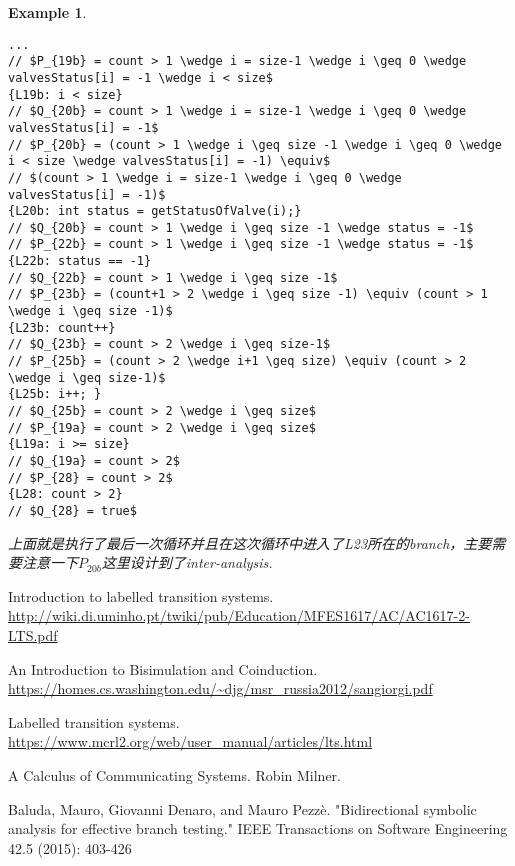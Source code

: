 \documentclass{article}
\newtheorem{example}[theorem]{Example}
\begin{document}
\begin{example}
\begin{verbatim}
...
// $P_{19b} = count > 1 \wedge i = size-1 \wedge i \geq 0 \wedge valvesStatus[i] = -1 \wedge i < size$
{L19b: i < size}
// $Q_{20b} = count > 1 \wedge i = size-1 \wedge i \geq 0 \wedge valvesStatus[i] = -1$
// $P_{20b} = (count > 1 \wedge i \geq size -1 \wedge i \geq 0 \wedge i < size \wedge valvesStatus[i] = -1) \equiv$
// $(count > 1 \wedge i = size-1 \wedge i \geq 0 \wedge valvesStatus[i] = -1)$
{L20b: int status = getStatusOfValve(i);}
// $Q_{20b} = count > 1 \wedge i \geq size -1 \wedge status = -1$
// $P_{22b} = count > 1 \wedge i \geq size -1 \wedge status = -1$
{L22b: status == -1}
// $Q_{22b} = count > 1 \wedge i \geq size -1$
// $P_{23b} = (count+1 > 2 \wedge i \geq size -1) \equiv (count > 1 \wedge i \geq size -1)$
{L23b: count++}
// $Q_{23b} = count > 2 \wedge i \geq size-1$
// $P_{25b} = (count > 2 \wedge i+1 \geq size) \equiv (count > 2 \wedge i \geq size-1)$ 
{L25b: i++; }
// $Q_{25b} = count > 2 \wedge i \geq size$
// $P_{19a} = count > 2 \wedge i \geq size$
{L19a: i >= size}
// $Q_{19a} = count > 2$ 
// $P_{28} = count > 2$
{L28: count > 2}
// $Q_{28} = true$
\end{verbatim}
上面就是执行了最后一次循环并且在这次循环中进入了L23所在的branch，主要需要注意一下$P_{20b}$这里设计到了inter-analysis. 
\end{example}

\newpage
\begin{thebibliography}{9}
Introduction to labelled transition systems. \newline\url{http://wiki.di.uminho.pt/twiki/pub/Education/MFES1617/AC/AC1617-2-LTS.pdf}

An Introduction to Bisimulation and Coinduction. \newline\url{https://homes.cs.washington.edu/~djg/msr_russia2012/sangiorgi.pdf}

Labelled transition systems. \newline\url{https://www.mcrl2.org/web/user_manual/articles/lts.html}


A Calculus of Communicating Systems. Robin Milner. 

Baluda, Mauro, Giovanni Denaro, and Mauro Pezzè. "Bidirectional symbolic analysis for effective branch testing." IEEE Transactions on Software Engineering 42.5 (2015): 403-426
\end{thebibliography}
\end{document}
